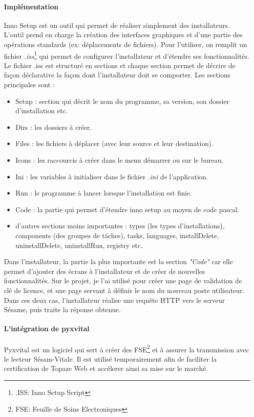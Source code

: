 \paragraph*{Implémentation}
Inno Setup est un outil qui permet de réaliser simplement des installateurs. L'outil prend en charge la création des interfaces graphiques et d'une partie des opérations standards (ex: déplacements de fichiers). Pour l'utiliser, on remplit un fichier \textit{.iss}\footnote{.ISS: Inno Setup Script} qui permet de configurer l'installateur et d'étendre ses fonctionnalités. Le fichier .iss est structuré en sections et chaque section permet de décrire de façon déclarative la façon dont l'installateur doit se comporter. Les sections principales sont : 
\begin{itemize}
\item Setup : section qui décrit le nom du programme, sa version, son dossier d'installation etc.
\item Dirs : les dossiers à créer.
\item Files : les fichiers à déplacer (avec leur source et leur destination).
\item Icons : les raccourcis à créer dans le menu démarrer ou sur le bureau.
\item Ini : les variables à initialiser dans le fichier \textit{.ini} de l'application.
\item Run : le programme à lancer lorsque l'installation est finie.
\item Code : la partie qui permet d'étendre inno setup au moyen de code pascal.
\item d'autres sections moins importantes : types (les types d'installations), components (des groupes de tâches), tasks, languages, installDelete, uninstallDelete, uninstallRun, registry etc.
\end{itemize}  

Dans l'installateur, la partie la plus importante est la section \textit{"Code"} car elle permet d'ajouter des écrans à l'installateur et de créer de nouvelles fonctionnalités. Sur le projet, je l'ai utilisé pour créer une page de validation de clé de licence, et une page servant à définir le nom du nouveau poste utilisateur.\\
Dans ces deux cas, l'installateur réalise une requête HTTP vers le serveur Sésame, puis traite la réponse obtenue. 

\paragraph*{L'intégration de pyxvital}
Pyxvital est un logiciel qui sert à créer des FSE\footnote{FSE: Feuille de Soins Electroniques} et à assurer la transmission avec le lecteur Sésam-Vitale. Il est utilisé temporairement afin de faciliter la certification de Topaze Web et accélerer ainsi sa mise sur le marché.

